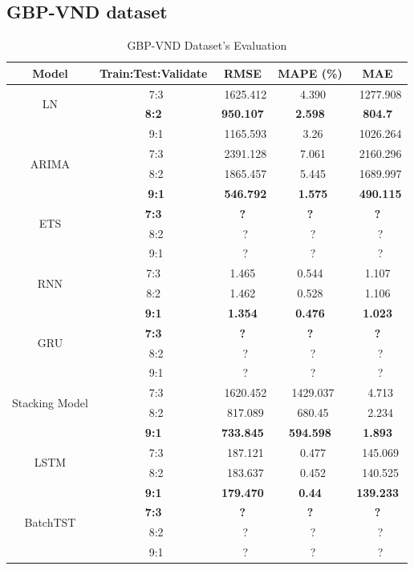\documentclass{ieeeojies}
\begin{document}
\subsection{GBP-VND dataset} 
\begin{table}[H]
    \centering
    \begin{tabular}{|c|c|c|c|c|}
         \hline
         \centering Model & Train:Test:Validate & RMSE & MAPE (\%) & MAE\\
         \hline
         \multirow{2}{*}{LN} &\ 7:3  &\ 1625.412 &\ 4.390 &\ 1277.908  \\ &\textbf{8:2} &\textbf{950.107} &\textbf{2.598} &\textbf{804.7} \\&\ 9:1 &\ 1165.593 &\ 3.26 &\ 1026.264 \\
         \hline
         \multirow{2}{*}{ARIMA} &\ 7:3 &\ 2391.128&\ 7.061 &\ 2160.296 \\ &\ 8:2 &\ 1865.457 &\ 5.445 &\ 1689.997 \\&\ \textbf{9:1} &\ \textbf{546.792} &\ \textbf{1.575} &\ \textbf{490.115} \\
         \hline
         \multirow{2}{*}{ETS} &\textbf{7:3} &\textbf{?}&\textbf{?}&\textbf{?} \\ &\ 8:2 &\ ?&\ ? &\ ? \\&\ 9:1 &\ ? &\ ? &\ ? \\
         \hline
         \multirow{2}{*}{RNN} & 7:3 & 1.465 & 0.544 & 1.107  \\ & 8:2 & 1.462 & 0.528 & 1.106 \\&\textbf{ 9:1} & \textbf{1.354} &\textbf{ 0.476} &\textbf{ 1.023} \\
         \hline
         \multirow{2}{*}{GRU} &\textbf{7:3} &\textbf{?}&\textbf{?}&\textbf{?} \\ &\ 8:2 &\ ?&\ ? &\ ? \\&\ 9:1 &\ ? &\ ? &\ ? \\
         \hline
         \multirow{2}{*}{Stacking Model} &\ 7:3 &\ 1620.452&\ 1429.037&\ 4.713 \\ &\ 8:2 &\ 817.089&\ 680.45 &\ 2.234 \\&\textbf{9:1} &\textbf{733.845} &\textbf{594.598} &\textbf{1.893} \\
         \hline
         \multirow{2}{*}{LSTM} &\ 7:3 &\ 187.121 &\ 0.477 &\ 145.069 \\ &\ 8:2 &\ 183.637 &\ 0.452 &\ 140.525 \\&\textbf{9:1} &\textbf{179.470} &\textbf{0.44} &\textbf{139.233} \\
         \hline
         \multirow{2}{*}{BatchTST} &\textbf{7:3} &\textbf{?}&\textbf{?}&\textbf{?} \\ &\ 8:2 &\ ?&\ ? &\ ? \\&\ 9:1 &\ ? &\ ? &\ ? \\
         \hline
    \end{tabular}
    \caption{GBP-VND Dataset's Evaluation}
    \label{mbbresult}
\end{table}
\end{document}

